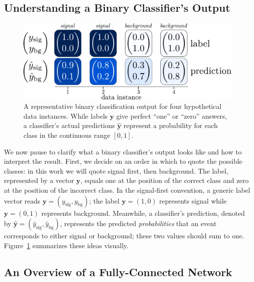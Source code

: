 \documentclass[11pt, a4paper]{article}
\renewcommand{\vec}[1]{\bm{#1}}
\newcommand{\y}{\vec{y}}
\begin{document}
\subsection{Understanding a Binary Classifier's Output} \label{ss:output}

\begin{figure}[htb!]
    \centering
    \includegraphics[width=0.85\linewidth]{vector/binary-output.pdf}
    \caption{A representative binary classification output for four hypothetical data instances.
    While labels $ \y $ give perfect ``one'' or ``zero'' answers, a classifier's actual predictions $ \hat{\y} $ represent a probability for each class in the continuous range $ [0, 1] $.}
    \label{fig:output}
\end{figure}

We now pause to clarify what a binary classifier's output looks like and how to interpret the result.
First, we decide on an order in which to quote the possible classes: in this work we will quote signal first, then background.
The label, represented by a vector $ \vec{y} $, equals one at the position of the correct class and zero at the position of the incorrect class.
In the signal-first convention, a generic label vector reads $ \vec{y} = (y_{\text{sig}}, y_{\text{bg}}) $; the label $ \vec{y} = (1, 0) $ represents signal while $ \vec{y} = (0, 1) $ represents background.
Meanwhile, a classifier's prediction, denoted by $ \hat{\y} = (\hat{y}_{\text{sig}}, \hat{y}_{\text{bg}})$, represents the predicted \textit{probabilities} that an event corresponds to either signal or background; these two values should sum to one.
Figure~\ref{fig:output} summarizes these ideas visually.


\subsection{An Overview of a Fully-Connected Network} \label{ss:fcn-first-look}
\end{document}
